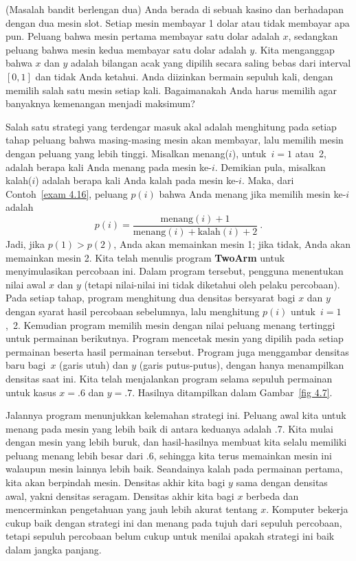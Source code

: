 \begin{example}(Masalah bandit berlengan dua)\label{exam 4.17}
Anda berada di sebuah kasino dan berhadapan dengan dua mesin slot.  Setiap mesin membayar
1 dolar atau tidak membayar apa pun.  Peluang bahwa mesin pertama membayar
satu dolar adalah $x$, sedangkan peluang bahwa mesin kedua membayar satu dolar adalah $y$.  Kita menganggap
bahwa $x$ dan $y$ adalah bilangan acak yang dipilih secara saling bebas dari interval
$[0,1]$ dan tidak Anda ketahui.  Anda diizinkan bermain sepuluh kali,
dengan memilih salah satu mesin setiap kali.  Bagaimanakah Anda harus memilih agar
banyaknya kemenangan menjadi maksimum?

Salah satu strategi yang terdengar masuk akal adalah menghitung pada setiap tahap
peluang bahwa masing-masing mesin akan membayar, lalu memilih mesin dengan
peluang yang lebih tinggi.  Misalkan menang($i$), untuk~$i = 1$ atau~2, adalah berapa kali
Anda menang pada mesin ke-$i$.  Demikian pula, misalkan kalah($i$) adalah berapa kali
Anda kalah pada mesin ke-$i$.  Maka, dari Contoh~\ref{exam
4.16}, peluang $p(i)$ bahwa Anda menang jika memilih mesin ke-$i$ adalah 
$$
p(i) = \frac {{\mbox{menang}}(i) + 1} {{\mbox{menang}}(i) + {\mbox{kalah}}(i) + 2}\ .
$$
Jadi, jika $p(1) > p(2)$, Anda akan memainkan mesin 1; jika tidak, Anda akan memainkan
mesin 2.  Kita telah menulis program {\bf TwoArm} untuk menyimulasikan
percobaan ini.  Dalam program tersebut, pengguna menentukan nilai awal $x$ dan
$y$ (tetapi nilai-nilai ini tidak diketahui oleh pelaku percobaan).  Pada
setiap tahap, program menghitung dua densitas bersyarat bagi $x$ dan $y$ dengan syarat hasil
percobaan sebelumnya, lalu menghitung $p(i)$ untuk~$i = 1$,~2.  Kemudian program memilih
mesin dengan nilai peluang menang tertinggi untuk permainan
berikutnya.  Program mencetak mesin yang dipilih pada setiap permainan beserta hasil
permainan tersebut.  Program juga menggambar densitas baru bagi~$x$ (garis utuh) dan $y$
(garis putus-putus), dengan hanya menampilkan densitas saat ini.  Kita telah menjalankan program selama
sepuluh permainan untuk kasus $x = .6$ dan $y = .7$.  Hasilnya ditampilkan dalam
Gambar~\ref{fig 4.7}.


Jalannya program menunjukkan kelemahan strategi ini.  Peluang awal kita untuk
menang pada mesin yang lebih baik di antara keduanya adalah .7.  Kita mulai dengan
mesin yang lebih buruk, dan hasil-hasilnya membuat kita selalu memiliki peluang menang
lebih besar dari .6, sehingga kita terus memainkan mesin ini walaupun
mesin lainnya lebih baik.  Seandainya kalah pada permainan pertama, kita akan
berpindah mesin.  Densitas akhir kita bagi $y$ sama dengan densitas
awal, yakni densitas seragam.  Densitas akhir kita bagi $x$ berbeda
dan mencerminkan pengetahuan yang jauh lebih akurat tentang $x$.  Komputer bekerja cukup
baik dengan strategi ini dan menang pada tujuh dari sepuluh percobaan, tetapi sepuluh percobaan
belum cukup untuk menilai apakah strategi ini baik dalam jangka panjang.


\end{example}
